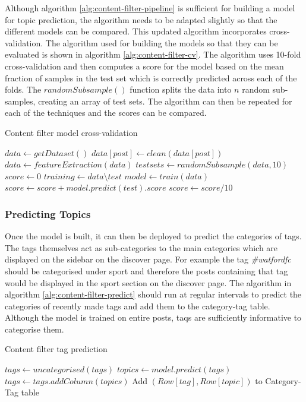 Although algorithm \ref{alg:content-filter-pipeline} is sufficient for building a model for topic prediction, the algorithm needs to be adapted slightly so that the different models can be compared. This updated algorithm incorporates cross-validation. The algorithm used for building the models so that they can be evaluated is shown in algorithm \ref{alg:content-filter-cv}. The algorithm uses 10-fold cross-validation and then computes a score for the model based on the mean fraction of samples in the test set which is correctly predicted across each of the folds. The $randomSubsample()$ function splits the data into $n$ random sub-samples, creating an array of test sets. The algorithm can then be repeated for each of the techniques and the scores can be compared.

\begin{algorithm}
\caption{Content filter model cross-validation}
\label{alg:content-filter-cv}
\begin{algorithmic}[1]
\State $data\gets getDataset()$
    \State $data[post]\gets clean(data[post])$
\EndFor
\State $data\gets featureExtraction(data)$
\State $testsets\gets randomSubsample(data, 10)$
\State $score\gets 0$
    \State $training\gets data\setminus test$
    \State $model\gets train(data)$
    \State $score\gets score + model.predict(test).score$
\EndFor
\State $score\gets score/10$
\end{algorithmic}
\end{algorithm}

\subsubsection{Predicting Topics}
Once the model is built, it can then be deployed to predict the categories of tags. The tags themselves act as sub-categories to the main categories which are displayed on the sidebar on the discover page. For example the tag \textit{\#watfordfc} should be categorised under sport and therefore the posts containing that tag would be displayed in the sport section on the discover page. The algorithm in algorithm \ref{alg:content-filter-predict} should run at regular intervals to predict the categories of recently made tags and add them to the category-tag table. Although the model is trained on entire posts, taqs are sufficiently informative to categorise them.

\begin{algorithm}
\caption{Content filter tag prediction}
\label{alg:content-filter-predict}
\begin{algorithmic}[1]
    \State $tags\gets uncategorised(tags)$
    \State $topics\gets model.predict(tags)$
    \State $tags \gets tags.addColumn(topics)$
        \State Add $(Row[tag],Row[topic])$ to Category-Tag table
    \EndFor
\EndFunction
\end{algorithmic}
\end{algorithm}

